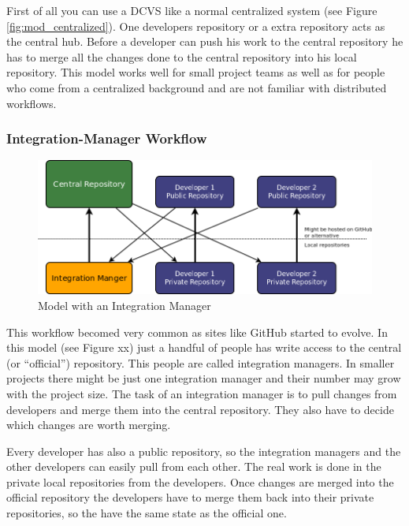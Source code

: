 First of all you can use a DCVS like a normal centralized system (see Figure \ref{fig:mod_centralized}). One developers repository or a extra repository acts as the central hub. Before a developer can push his work to the central repository he has to merge all the changes done to the central repository into his local repository. This model works well for small project teams as well as for people who come from a centralized background and are not familiar with distributed workflows.


\subsubsection{Integration-Manager Workflow}

\begin{figure}[tbp]
  \centering
  \includegraphics[width=\textwidth]{img/Mod_IntegrationManager}
  \caption{Model with an Integration Manager}
  \label{fig:mod_intMan} 
\end{figure}

This workflow becomed very common as sites like GitHub started to evolve. In
this model (see Figure xx) just a handful of people has write access to the central (or “official”) repository. 
This people are called integration managers. In smaller projects there might be just one integration manager and their 
number may grow with the project size. The task of an integration manager is to pull changes from developers and merge 
them into the central repository. They also have to decide which changes are worth merging.

Every developer has also a public repository, so the integration managers and the other developers can easily pull from 
each other. The real work is done in the private local repositories from the developers. Once changes are merged into the 
official repository the developers have to merge them back into their private repositories, so the have the same state as the official one.

